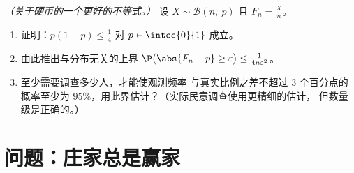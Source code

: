 \begin{exercise}[$\star\star\star$]\label{exo:g12:sums:8}
\emph{（关于硬币的一个更好的不等式。）}
设 $X \sim \mathcal B(n,\ p)$ 且 $F_n = \frac Xn$。
\begin{enumerate}
  \item 证明：$p(1-p) \leq \frac14$ 对 $p \in \intcc{0}{1}$ 成立。
  \item 由此推出与分布无关的上界
        $\P\bigl(\abs{F_n - p} \geq \varepsilon\bigr) \leq
        \frac{1}{4n\varepsilon^2}$。
  \item 至少需要调查多少人，才能使观测频率
        与真实比例之差不超过 $3$ 个百分点的概率至少为
        $95\%$，用此界估计？（实际民意调查使用更精细的估计，
        但数量级是正确的。）
\end{enumerate}
\end{exercise}

\section{问题：庄家总是赢家}

